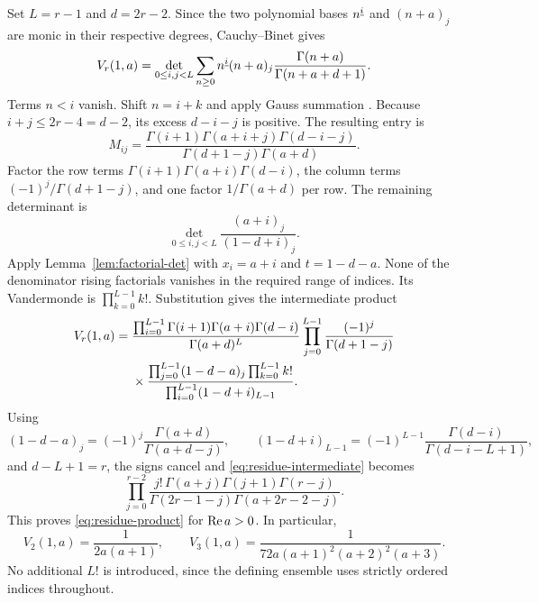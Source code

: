 Set $L=r-1$ and $d=2r-2$. Since the two polynomial bases
$n^{\underline{i}}$ and $(n+a)_j$ are monic in their respective degrees,
Cauchy--Binet gives
\begin{equation}\label{eq:residue-mixed-moment}
 V_r(1,a)=\det_{0\le i,j<L}
 \sum_{n\ge0}n^{\underline{i}}(n+a)_j
             \frac{\Gamma(n+a)}{\Gamma(n+a+d+1)}.
\end{equation}
Terms $n<i$ vanish. Shift $n=i+k$ and apply Gauss summation
\cite{dlmf:gauss}. Because $i+j\le2r-4=d-2$, its excess
$d-i-j$ is positive. The resulting entry is
\begin{equation}\label{eq:residue-entry}
 M_{ij}=\frac{\Gamma(i+1)\Gamma(a+i+j)\Gamma(d-i-j)}
                    {\Gamma(d+1-j)\Gamma(a+d)}.
\end{equation}
Factor the row terms $\Gamma(i+1)\Gamma(a+i)\Gamma(d-i)$,
the column terms $(-1)^j/\Gamma(d+1-j)$, and one factor
$1/\Gamma(a+d)$ per row. The remaining determinant is
\[
 \det_{0\le i,j<L}\frac{(a+i)_j}{(1-d+i)_j}.
\]
Apply Lemma~\ref{lem:factorial-det} with
$x_i=a+i$ and $t=1-d-a$. None of the denominator rising factorials
vanishes in the required range of indices. Its Vandermonde is
$\prod_{k=0}^{L-1}k!$. Substitution gives the intermediate product
\begin{align}
 V_r(1,a)={}&
 \frac{\prod_{i=0}^{L-1}\Gamma(i+1)\Gamma(a+i)\Gamma(d-i)}
      {\Gamma(a+d)^L}
 \prod_{j=0}^{L-1}\frac{(-1)^j}{\Gamma(d+1-j)}\notag\\
 &\times
 \frac{\prod_{j=0}^{L-1}(1-d-a)_j\prod_{k=0}^{L-1}k!}
      {\prod_{i=0}^{L-1}(1-d+i)_{L-1}}.
 \label{eq:residue-intermediate}
\end{align}
Using
\[
 (1-d-a)_j=(-1)^j\frac{\Gamma(a+d)}{\Gamma(a+d-j)},\qquad
 (1-d+i)_{L-1}=(-1)^{L-1}
       \frac{\Gamma(d-i)}{\Gamma(d-i-L+1)},
\]
and $d-L+1=r$, the signs cancel and
\eqref{eq:residue-intermediate} becomes
\[
 \prod_{j=0}^{r-2}
 \frac{j!\,\Gamma(a+j)\Gamma(j+1)\Gamma(r-j)}
       {\Gamma(2r-1-j)\Gamma(a+2r-2-j)}.
\]
This proves \eqref{eq:residue-product} for $\operatorname{Re} a>0$. In particular,
\[
 V_2(1,a)=\frac1{2a(a+1)},\qquad
 V_3(1,a)=\frac1{72a(a+1)^2(a+2)^2(a+3)}.
\]
No additional $L!$ is introduced, since the defining ensemble uses
strictly ordered indices throughout.
